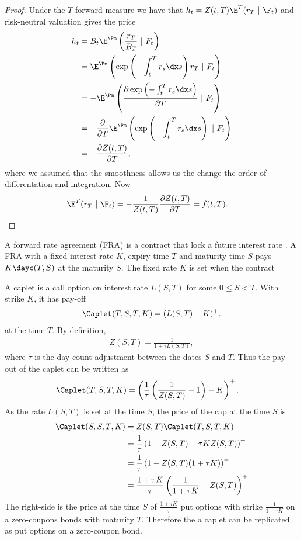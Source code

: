 \begin{proof}
Under the $T$-forward measure we have that $h_t = Z(t,T) \E^T ( r_T \ | \ \F_t )$ and risk-neutral valuation gives the price
  \begin{align}
    h_t &= B_t \E^{\Pm} \left( \frac{r_T}{B_T} \ | \ F_t \right) \\
      &= \E^{\Pm} \left( \exp \left( -\int_t^T r_s \dx s \right) r_T \ | \ F_t \right) \\
      &= - \E^{\Pm} \left( \frac{ \partial \exp \left( -\int_t^T r_s \dx s \right)}{\partial T} \ | \ F_t \right) \\
      &= - \frac{\partial }{\partial T} \E^{\Pm} \left( \exp \left( -\int_t^T r_s \dx s \right) \ | \ F_t \right) \\
      &= - \frac{\partial Z(t,T)}{\partial T},
  \end{align}
where we assumed that the smoothness allows us the change the order of differentation and integration. Now
  \begin{align}
    \E^T ( r_T \ | \ \F_t ) &= -\frac{1}{Z(t,T)} \frac{\partial Z(t,T)}{\partial T} = f(t,T) .
  \end{align}
\end{proof}

A forward rate agreement (FRA) is a contract that lock a future interest rate . A FRA with a fixed interest rate $K$, expiry time $T$ and maturity time $S$ pays $K \dayc(T,S)$ at the maturity $S$. The fixed rate $K$ is set when the contract 

A caplet is a call option on interest rate $L(S,T)$ for some $0 \leq S < T$. With strike $K$, it has pay-off 
  \begin{align}
     \Caplet (T,S,T,K) = (L(S,T) - K)^+ .
  \end{align}
at the time $T$. By definition,
  \begin{align}
    Z(S,T) = \frac{1}{1+\tau L(S,T)},
  \end{align}
where $\tau$ is the day-count adjustment between the dates $S$ and $T$. Thus the pay-out of the caplet can be written as
  \begin{align}
    \Caplet (T, S,T,K) &= \left( \frac{1}{\tau} \left( \frac{1}{Z(S,T)} - 1 \right) - K \right)^+.
  \end{align}
As the rate $L(S,T)$ is set at the time $S$, the price of the cap at the time $S$ is
  \begin{align}
     \Caplet (S,S,T,K) &= Z(S,T) \Caplet (T,S,T,K) \\
     &= \frac{1}{\tau} \left(  1 - Z(S,T)  - \tau K Z(S,T) \right)^+ \\
      &= \frac{1}{\tau} \left(  1 - Z(S,T) ( 1 + \tau K ) \right)^+ \\
      &= \frac{ 1 + \tau K }{\tau} \left( \frac{1}{1 + \tau K}  - Z(S,T) \right)^+
  \end{align}
The right-side is the price at the time $S$ of $\frac{ 1 + \tau K }{\tau}$ put options with strike $\frac{1}{1 + \tau K}$ on a zero-coupons bonds with maturity $T$. Therefore the a caplet can be replicated as put options on a zero-coupon bond.

